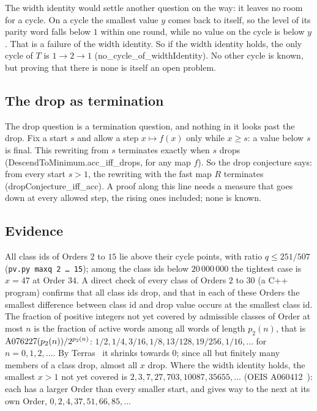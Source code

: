\documentclass[10pt,a4paper,titlepage]{article}
\newcommand{\lean}[1]{\textsf{#1}}
\newcommand{\pv}[1]{\texttt{pv.py #1}}
\begin{document}
\nopagebreak
The width identity would settle another question on the way: it leaves no room
for a cycle. On a cycle the smallest value $y$ comes back to itself, so the level
of its parity word falls below $1$ within one round, while no value on the cycle
is below $y$. That is a failure of the width identity. So if the width
identity holds, the only cycle of $T$ is $1 \to 2 \to 1$
(\lean{no\_cycle\_of\_widthIdentity}). No other cycle is known, but proving that
there is none is itself an open problem.

\subsection*{The drop as termination}

The drop question is a termination question, and nothing in it looks past the
drop. Fix a start $s$ and allow a step $x \mapsto f(x)$ only while $x \ge s$:
a value below $s$ is final. This rewriting from $s$ terminates exactly when $s$
drops (\lean{DescendToMinimum.acc\_iff\_drops}, for any map $f$). So the drop conjecture says:
from every start $s > 1$, the rewriting with the fast map $R$ terminates
(\lean{dropConjecture\_iff\_acc}). A proof along this line needs a measure that
goes down at every allowed step, the rising ones included; none is known.

\subsection*{Evidence}

All class ids of Orders $2$ to $15$ lie above their cycle points, with ratio
$q \le 251/507$ (\pv{maxq 2 \dots\ 15}); among the class ids below $20\,000\,000$ the tightest case is
$x = 47$ at Order $34$.
A direct check of every class of Orders $2$ to $30$ (a C++ program) confirms that all class ids
drop, and that in each of these Orders the smallest difference between class id
and drop value occurs at the smallest class id.
The fraction of positive integers not yet covered by admissible classes of
Order at most $n$ is the fraction of active words among all words of length
$p_2(n)$, that is $\mathrm{A076227}\index{OEIS!A076227}(p_2(n))/2^{p_2(n)}$: $1/2, 1/4, 3/16, 1/8, 13/128,
19/256, 1/16, \dots$ for $n = 0, 1, 2, \dots$. By Terras~\cite{Terras1976} it shrinks towards $0$; since
all but finitely many members of a class drop, almost all $x$ drop. Where the width identity holds, the smallest $x > 1$ not yet covered
is $2, 3, 7, 27, 703, 10087, 35655, \dots$ (OEIS A060412~\cite{OEIS_A060412}): each has a larger Order
than every smaller start, and gives way to the next at its own Order,
$0, 2, 4, 37, 51, 66, 85, \dots$
\end{document}
